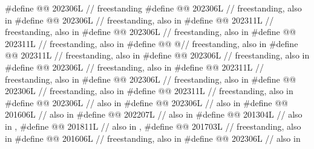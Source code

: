 \begin{codeblock}
#define @@  202306L // freestanding
#define @@           202306L // freestanding, also in 
#define @@             202306L // freestanding, also in 
#define @@               202311L // freestanding, also in 
#define @@               202306L // freestanding, also in 
#define @@              202311L // freestanding, also in 
#define @@         @\seebelow@ // freestanding, also in 
#define @@             202311L // freestanding, also in 
#define @@               202306L // freestanding, also in 
#define @@                202306L // freestanding, also in 
#define @@          202311L // freestanding, also in 
#define @@                202306L // freestanding, also in 
#define @@              202306L // freestanding, also in 
#define @@              202311L // freestanding, also in 
#define @@             202306L // also in 
#define @@                      202306L // also in 
#define @@                           201606L // also in 
#define @@                         202207L // also in 
#define @@        201304L // also in , 
#define @@          201811L
  // also in , 
#define @@        201703L // freestanding, also in 
#define @@ 201606L // freestanding, also in 
#define @@                    202306L // also in 

\end{codeblock}
